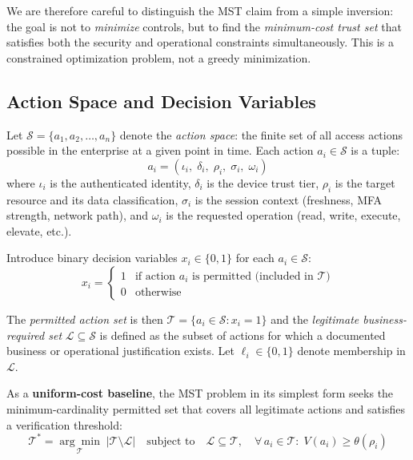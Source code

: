 \documentclass[unnumsec,webpdf,contemporary,large]{oup-authoring-template}
\theoremstyle{thmstyleone}
\theoremstyle{thmstyletwo}
\theoremstyle{thmstylethree}
\begin{document}
\begin{appendices}
We are therefore careful to distinguish the MST claim from a simple inversion: the
goal is not to \textit{minimize} controls, but to find the \textit{minimum-cost
trust set} that satisfies both the security and operational constraints simultaneously.
This is a constrained optimization problem, not a greedy minimization.

\subsection{Action Space and Decision Variables}
\label{app:A2}

Let $\mathcal{S} = \{a_1, a_2, \ldots, a_n\}$ denote the \textit{action space}: the
finite set of all access actions possible in the enterprise at a given point in time.
Each action $a_i \in \mathcal{S}$ is a tuple:
\begin{equation}
a_i = (\iota_i,\; \delta_i,\; \rho_i,\; \sigma_i,\; \omega_i)
\label{eq:action_tuple}
\end{equation}
where $\iota_i$ is the authenticated identity, $\delta_i$ is the device trust tier,
$\rho_i$ is the target resource and its data classification, $\sigma_i$ is the
session context (freshness, MFA strength, network path), and $\omega_i$ is the
requested operation (read, write, execute, elevate, etc.).

Introduce binary decision variables $x_i \in \{0,1\}$ for each $a_i \in \mathcal{S}$:
\begin{equation}
x_i = \begin{cases} 1 & \text{if action } a_i \text{ is permitted (included in } \mathcal{T}) \\ 0 & \text{otherwise} \end{cases}
\label{eq:decision_var}
\end{equation}

The \textit{permitted action set} is then $\mathcal{T} = \{a_i \in \mathcal{S} : x_i = 1\}$
and the \textit{legitimate business-required set} $\mathcal{L} \subseteq \mathcal{S}$
is defined as the subset of actions for which a documented business or operational
justification exists. Let $\ell_i \in \{0,1\}$ denote membership in $\mathcal{L}$.

As a \textbf{uniform-cost baseline}, the MST problem in its simplest form seeks the
minimum-cardinality permitted set that covers all legitimate actions and satisfies a
verification threshold:
\begin{equation}
\mathcal{T}^{*} = \underset{\mathcal{T}}{\arg\min}\;
\bigl|\mathcal{T} \setminus \mathcal{L}\bigr|
\quad \text{subject to} \quad
\mathcal{L} \subseteq \mathcal{T},
\quad \forall\, a_i \in \mathcal{T}:\; V(a_i) \geq \theta(\rho_i)
\label{eq:mvt}
\end{equation}


\end{appendices}
\end{document}
